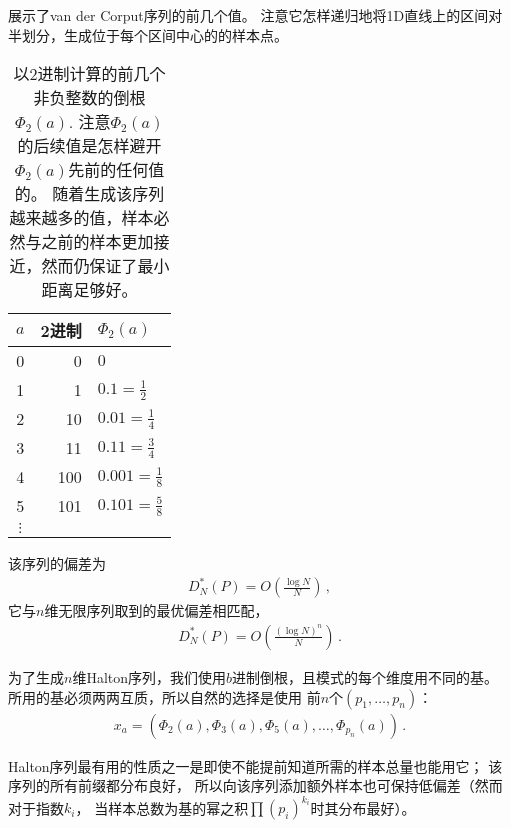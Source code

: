 展示了van der Corput序列的前几个值。
注意它怎样递归地将1D直线上的区间对半划分，生成位于每个区间中心的的样本点。
\begin{table}[htbp]
    \centering
    \begin{tabular}{crl}
        \toprule
        $a$      & \textbf{2进制} & $\varPhi_2(a)$      \\
        \midrule
        0        & 0              & $0$                 \\
        1        & 1              & $0.1=\frac{1}{2}$   \\
        2        & 10             & $0.01=\frac{1}{4}$  \\
        3        & 11             & $0.11=\frac{3}{4}$  \\
        4        & 100            & $0.001=\frac{1}{8}$ \\
        5        & 101            & $0.101=\frac{5}{8}$ \\
        $\vdots$ &                &                     \\
        \bottomrule
    \end{tabular}
    \caption{以2进制计算的前几个非负整数的倒根$\varPhi_2(a)$.
        注意$\varPhi_2(a)$的后续值是怎样避开$\varPhi_2(a)$先前的任何值的。
        随着生成该序列越来越多的值，样本必然与之前的样本更加接近，然而仍保证了最小距离足够好。}
    \label{tab:7.3}
\end{table}

该序列的偏差为
\begin{align*}
    D^*_N(P)=O\left(\frac{\log N}{N}\right)\, ,
\end{align*}
它与$n$维无限序列取到的最优偏差相匹配，
\begin{align*}
    D^*_N(P)=O\left(\frac{(\log N)^n}{N}\right)\, .
\end{align*}

为了生成$n$维Halton序列，我们使用$b$进制倒根，且模式的每个维度用不同的基。
所用的基必须两两互质，所以自然的选择是使用
前$n$个$(p_1,\ldots,p_n)$：
\begin{align*}
    x_a=(\varPhi_2(a),\varPhi_3(a),\varPhi_5(a),\ldots,\varPhi_{p_n}(a))\, .
\end{align*}

Halton序列最有用的性质之一是即使不能提前知道所需的样本总量也能用它；
该序列的所有前缀都分布良好，
所以向该序列添加额外样本也可保持低偏差（然而对于指数$k_i$，
当样本总数为基的幂之积$\prod(p_i)^{k_i}$时其分布最好）。

